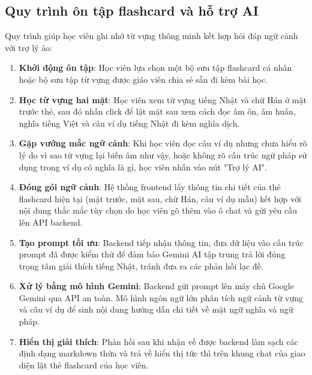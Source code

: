 \documentclass[../DoAn.tex]{subfiles}
\begin{document}
\subsection{Quy trình ôn tập flashcard và hỗ trợ AI}
Quy trình giúp học viên ghi nhớ từ vựng thông minh kết hợp hỏi đáp ngữ cảnh với trợ lý ảo:
\begin{enumerate}
    \item \textbf{Khởi động ôn tập}: Học viên lựa chọn một bộ sưu tập flashcard cá nhân hoặc bộ sưu tập từ vựng được giáo viên chia sẻ sẵn đi kèm bài học.
    \item \textbf{Học từ vựng hai mặt}: Học viên xem từ vựng tiếng Nhật và chữ Hán ở mặt trước thẻ, sau đó nhấn click để lật mặt sau xem cách đọc âm ôn, âm huấn, nghĩa tiếng Việt và câu ví dụ tiếng Nhật đi kèm nghĩa dịch.
    \item \textbf{Gặp vướng mắc ngữ cảnh}: Khi học viên đọc câu ví dụ nhưng chưa hiểu rõ lý do vì sao từ vựng lại biến âm như vậy, hoặc không rõ cấu trúc ngữ pháp sử dụng trong ví dụ có nghĩa là gì, học viên nhấn vào nút "Trợ lý AI".
    \item \textbf{Đóng gói ngữ cảnh}: Hệ thống frontend lấy thông tin chi tiết của thẻ flashcard hiện tại (mặt trước, mặt sau, chữ Hán, câu ví dụ mẫu) kết hợp với nội dung thắc mắc tùy chọn do học viên gõ thêm vào ô chat và gửi yêu cầu lên API backend.
    \item \textbf{Tạo prompt tối ưu}: Backend tiếp nhận thông tin, đưa dữ liệu vào cấu trúc prompt đã được kiểm thử để đảm bảo Gemini AI tập trung trả lời đúng trọng tâm giải thích tiếng Nhật, tránh đưa ra các phản hồi lạc đề.
    \item \textbf{Xử lý bằng mô hình Gemini}: Backend gửi prompt lên máy chủ Google Gemini qua API an toàn. Mô hình ngôn ngữ lớn phân tích ngữ cảnh từ vựng và câu ví dụ để sinh nội dung hướng dẫn chi tiết về mặt ngữ nghĩa và ngữ pháp.
    \item \textbf{Hiển thị giải thích}: Phản hồi sau khi nhận về được backend làm sạch các định dạng markdown thừa và trả về hiển thị tức thì trên khung chat của giao diện lật thẻ flashcard của học viên.
\end{enumerate}
\end{document}
